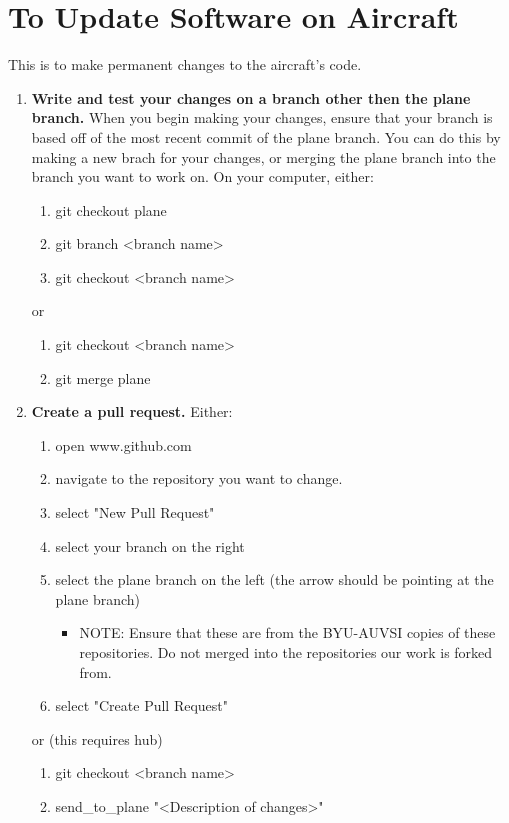 \documentclass[]{auvsi_doc}
\begin{document}
\section{To Update Software on Aircraft}
This is to make permanent changes to the aircraft's code.
\begin{enumerate}
	\item \textbf{Write and test your changes on a branch other then the plane branch.} When you begin making your changes, ensure that your branch is based off of the most recent commit of the plane branch. You can do this by making a new brach for your changes, or merging the plane branch into the branch you want to work on. On your computer, either:
	\begin{enumerate}
		\item git checkout plane
		\item git branch \textless branch name\textgreater
		\item git checkout \textless branch name\textgreater
	\end{enumerate}
	or 
	\begin{enumerate}
		\item git checkout \textless branch name\textgreater
		\item git merge plane
	\end{enumerate}
	\item \textbf{Create a pull request.} Either:
	\begin{enumerate}
		\item open www.github.com
		\item navigate to the repository you want to change.
		\item select "New Pull Request"
		\item select your branch on the right
		\item select the plane branch on the left (the arrow should be pointing at the plane branch)
		\begin{itemize}
			\item NOTE: Ensure that these are from the BYU-AUVSI copies of these repositories. Do not merged into the repositories our work is forked from.
		\end{itemize}
		\item select "Create Pull Request"
	\end{enumerate}
	or (this requires hub)
	\begin{enumerate}
		\item git checkout \textless branch name\textgreater
		\item send\_to\_plane "\textless Description of changes\textgreater"

\end{enumerate}
\end{enumerate}
\end{document}
